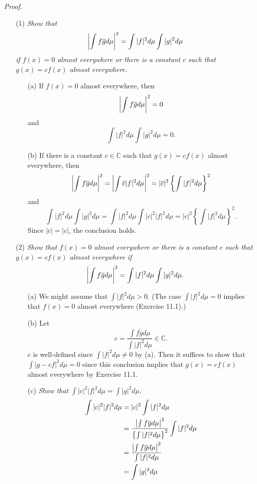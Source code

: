 \documentclass{article}
\begin{document}
\emph{Proof.}
\begin{enumerate}
\item[(1)]
  \emph{Show that
  \[
    \abs{ \int f\overline{g} d\mu }^2 = \int |f|^2 d\mu \int |g|^2 d\mu
  \]
  if $f(x) = 0$ almost everywhere or
  there is a constant $c$ such that $g(x) = cf(x)$ almost everywhere.}
  \begin{enumerate}
  \item[(a)]
    If $f(x) = 0$ almost everywhere,
    then
    \[
      \abs{ \int f\overline{g} d\mu }^2 = 0
    \]
    and
    \[
      \int |f|^2 d\mu \int |g|^2 d\mu = 0.
    \]

  \item[(b)]
    If there is a constant $c \in \mathbb{C}$ such that $g(x) = cf(x)$ almost everywhere,
    then
    \[
      \abs{ \int f\overline{g} d\mu }^2
      = \abs{ \int \overline{c}|f|^2 d\mu }^2
      = |\overline{c}|^2 \left\{ \int |f|^2 d\mu \right\}^2
    \]
    and
    \[
      \int |f|^2 d\mu \int |g|^2 d\mu
      = \int |f|^2 d\mu \int |c|^2 |f|^2 d\mu
      = |c|^2 \left\{ \int |f|^2 d\mu \right\}^2.
    \]
    Since $|\overline{c}| = |c|$, the conclusion holds.
  \end{enumerate}

\item[(2)]
  \emph{Show that $f(x) = 0$ almost everywhere
  or there is a constant $c$ such that $g(x) = cf(x)$ almost everywhere
  if}
  \[
    \abs{ \int f\overline{g} d\mu }^2 = \int |f|^2 d\mu \int |g|^2 d\mu.
  \]
  \begin{enumerate}
  \item[(a)]
    We might assume that $\int |f|^2 d\mu > 0$.
    (The case $\int |f|^2 d\mu = 0$ implies that $f(x) = 0$ almost everywhere (Exercise 11.1).)

  \item[(b)]
    Let
    \[
      c = \frac{\overline{\int f\overline{g} d\mu}}{\int |f|^2 d\mu} \in \mathbb{C}.
    \]
    $c$ is well-defined since $\int |f|^2 d\mu \neq 0$ by (a).
    Then it suffices to show that $\int |g-cf|^2 d\mu = 0$
    since this conclusion implies that $g(x) = cf(x)$ almost everywhere by Exercise 11.1.

  \item[(c)]
    \emph{Show that $\int |c|^2|f|^2 d\mu = \int |g|^2 d\mu$.}
    \begin{align*}
      \int |c|^2|f|^2 d\mu
      &= |c|^2 \int |f|^2 d\mu \\
      &= \frac{\abs{ \int f\overline{g} d\mu }^2}{ \left\{ \int |f|^2 d\mu \right\}^2 }
        \int |f|^2 d\mu \\
      &= \frac{\abs{ \int f\overline{g} d\mu }^2}{\int |f|^2 d\mu} \\
      &= \int |g|^2 d\mu
    \end{align*}


\end{enumerate}
\end{enumerate}
\end{document}
